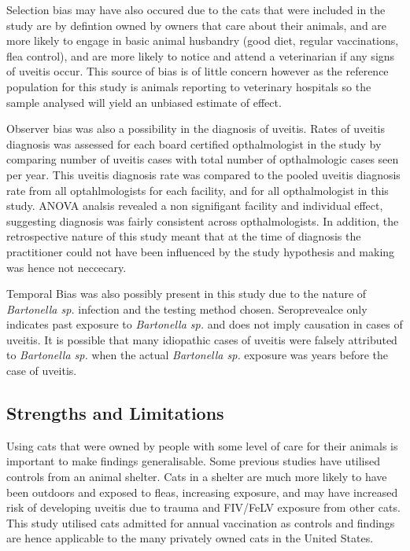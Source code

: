 \documentclass[11pt,twocolumn]{article}
\begin{document}
		Selection bias may have also occured due to the cats that were included in the study are by defintion owned by owners that care about their animals, and are more likely to engage in basic animal husbandry (good diet, regular vaccinations, flea control), and are more likely to notice and attend a veterinarian if any signs of uveitis occur.  
		This source of bias is of little concern however as the reference population for this study is animals reporting to veterinary hospitals so the sample analysed will yield an unbiased estimate of effect.


		Observer bias was also a possibility in the diagnosis of uveitis.
		Rates of uveitis diagnosis was assessed for each board certified opthalmologist in the study by comparing number of uveitis cases with total number of opthalmologic cases seen per year. This uveitis diagnosis rate was compared to the pooled uveitis diagnosis rate from all optahlmologists for each facility, and for all opthalmologist in this study.
		ANOVA analsis revealed a non signifigant facility and individual effect, suggesting diagnosis was fairly consistent across opthalmologists.
		In addition, the retrospective nature of this study meant that at the time of diagnosis the practitioner could not have been influenced by the study hypothesis and making was hence not neccecary. 


		Temporal Bias was also possibly present in this study due to the nature of \emph{Bartonella sp.} infection and the testing method chosen. 
		Seroprevealce only indicates past exposure to \emph{Bartonella sp.} and does not imply causation in cases of uveitis.
		It is possible that many idiopathic cases of uveitis were falsely attributed to \emph{Bartonella sp.} when the actual \emph{Bartonella sp.} exposure was years before the case of uveitis.


	\subsection{Strengths and Limitations}
		Using cats that were owned by people with  some level of care for their animals is important to make findings generalisable.
		Some previous studies have utilised controls from an animal shelter. Cats in a shelter are much more likely to have been outdoors and exposed to fleas, increasing exposure, and may have increased risk of developing uveitis due to trauma and FIV/FeLV exposure from other cats.
		This study utilised cats admitted for annual vaccination as controls and findings are hence applicable to the many privately owned cats in the United States.
\end{document}
